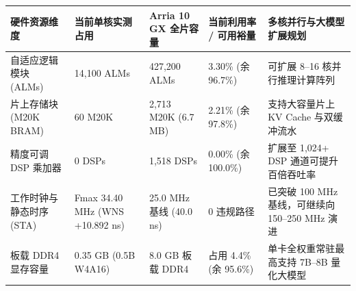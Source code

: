 \documentclass[11pt,a4paper]{article}
\begin{document}
{\footnotesize\renewcommand{\arraystretch}{1.14}\begin{longtable}{@{}L{0.19\textwidth}L{0.16\textwidth}L{0.16\textwidth}L{0.15\textwidth}L{0.24\textwidth}@{}}\toprule

\textbf{硬件资源维度} & \textbf{当前单核实测占用} & \textbf{Arria 10 GX 全片容量} & \textbf{当前利用率 /\allowbreak{} 可用裕量} & \textbf{多核并行与大模型扩展规划}\\\midrule\endhead

自适应逻辑模块 (\allowbreak{}ALMs)\allowbreak{} & 14,\allowbreak{}100 ALMs & 427,\allowbreak{}200 ALMs & 3.30\% (\allowbreak{}余 96.7\%)\allowbreak{} & 可扩展 8–16 核并行推理计算阵列\\[2pt]

片上存储块 (\allowbreak{}M20K BRAM)\allowbreak{} & 60 M20K & 2,\allowbreak{}713 M20K (\allowbreak{}6.7 MB)\allowbreak{} & 2.21\% (\allowbreak{}余 97.8\%)\allowbreak{} & 支持大容量片上 KV Cache 与双缓冲流水\\[2pt]

精度可调 DSP 乘加器 & 0 DSPs & 1,\allowbreak{}518 DSPs & 0.00\% (\allowbreak{}余 100.0\%)\allowbreak{} & 扩展至 1,\allowbreak{}024+\allowbreak{} DSP 通道可提升百倍吞吐率\\[2pt]

工作时钟与静态时序 (\allowbreak{}STA)\allowbreak{} & Fmax 34.40 MHz (\allowbreak{}WNS +\allowbreak{}10.892 ns)\allowbreak{} & 25.0 MHz 基线 (\allowbreak{}40.0 ns)\allowbreak{} & 0 违规路径 & 已突破 100 MHz 基线，可继续向 150–250 MHz 演进\\[2pt]

板载 DDR4 显存容量 & 0.35 GB (\allowbreak{}0.5B W4A16)\allowbreak{} & 8.0 GB 板载 DDR4 & 占用 4.4\% (\allowbreak{}余 95.6\%)\allowbreak{} & 单卡全权重常驻最高支持 7B–8B 量化大模型\\[2pt]

\bottomrule\end{longtable}}
\end{document}
